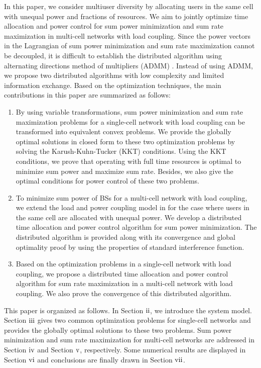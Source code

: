 \documentclass[journal]{IEEEtran}
\begin{document}
In this paper, we consider multiuser diversity by allocating users in the same cell with unequal power and fractions of resources.
We aim to jointly optimize time allocation and power control for sum power minimization and sum rate maximization in multi-cell networks with load coupling.
Since the power vectors in the Lagrangian of sum power minimization and sum rate maximization cannot be decoupled, it is difficult to establish the distributed algorithm using alternating directions method of multipliers (ADMM) \cite{6484993,6156468,6748974}.
Instead of using ADMM, we propose two distributed algorithms with low complexity and limited information exchange.
Based on the optimization techniques, the main contributions in this paper are summarized as follows:

\begin{enumerate}
  \item By using variable transformations, sum power minimization and sum rate maximization problems for a single-cell network with load coupling can be transformed into equivalent convex problems.
      We provide the globally optimal solutions in closed form to these two optimization problems by solving the Karush-Kuhn-Tucker (KKT) conditions.
      Using the KKT conditions, we prove that operating with full time resources is optimal to minimize sum power and maximize sum rate.
      Besides, we also give the optimal conditions for power control of these two problems.
  \item To minimize sum power of BSs for a multi-cell network with load coupling, we extend the load and power coupling model in \cite{Chin2015Power} for the case where users in the same cell are allocated with unequal power.
      We develop a distributed time allocation and power control algorithm %
      for sum power minimization.
      The distributed algorithm is provided along with its convergence and global optimality proof by using the properties of standard interference function.
  \item Based on the optimization problems in a single-cell network with load coupling, we propose a distributed time allocation and power control algorithm for sum rate maximization in a multi-cell network with load coupling.
      We also prove the convergence of this distributed algorithm.
\end{enumerate}


This paper is organized as follows.
In Section $\text{\uppercase\expandafter{\romannumeral2}}$, we introduce the system model.
Section $\text{\uppercase\expandafter{\romannumeral3}}$ gives two common optimization problems for single-cell networks and provides the globally optimal solutions to these two problems.
Sum power minimization and sum rate maximization for multi-cell networks are addressed in Section $\text{\uppercase\expandafter{\romannumeral 4}}$ and Section $\text{\uppercase\expandafter{\romannumeral 5}}$, respectively.
Some numerical results are displayed in Section $\text{\uppercase\expandafter{\romannumeral6}}$
and conclusions are finally drawn in Section $\text{\uppercase\expandafter{\romannumeral7}}$.
\end{document}
